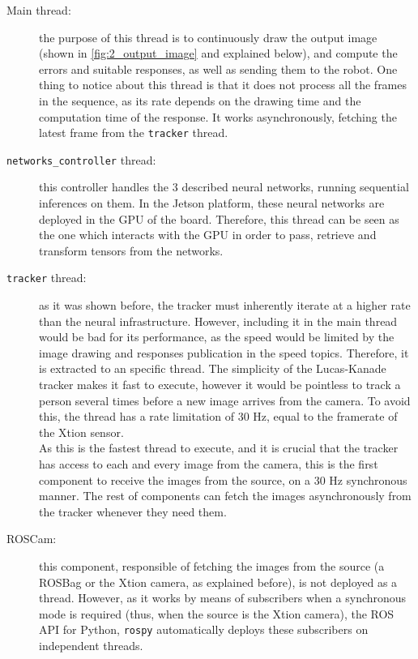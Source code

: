 \begin{description}
	\item[Main thread:] the purpose of this thread is to continuously draw the output image (shown in \autoref{fig:2_output_image} and explained below), and compute the errors and suitable responses, as well as sending them to the robot. One thing to notice about this thread is that it does not process all the frames in the sequence, as its rate depends on the drawing time and the computation time of the response. It works asynchronously, fetching the latest frame from the \texttt{tracker} thread.
	
	\item[\texttt{networks\_controller} thread:] this controller handles the 3 described neural networks, running sequential inferences on them. In the Jetson platform, these neural networks are deployed in the GPU of the board. Therefore, this thread can be seen as the one which interacts with the GPU in order to pass, retrieve and transform tensors from the networks.
	
	\item[\texttt{tracker} thread:] as it was shown before, the tracker must inherently iterate at a higher rate than the neural infrastructure. However, including it in the main thread would be bad for its performance, as the speed would be limited by the image drawing and responses publication in the speed topics. Therefore, it is extracted to an specific thread. The simplicity of the Lucas-Kanade tracker makes it fast to execute, however it would be pointless to track a person several times before a new image arrives from the camera. To avoid this, the thread has a rate limitation of 30 Hz, equal to the framerate of the Xtion sensor.\\
	
	As this is the fastest thread to execute, and it is crucial that the tracker has access to each and every image from the camera, this is the first component to receive the images from the source, on a 30 Hz synchronous manner. The rest of components can fetch the images asynchronously from the tracker whenever they need them.
	
	\item[ROSCam:] this component, responsible of fetching the images from the source (a ROSBag or the Xtion camera, as explained before), is not deployed as a thread. However, as it works by means of subscribers when a synchronous mode is required (thus, when the source is the Xtion camera), the ROS API for Python, \texttt{rospy} automatically deploys these subscribers on independent threads.
\end{description}

